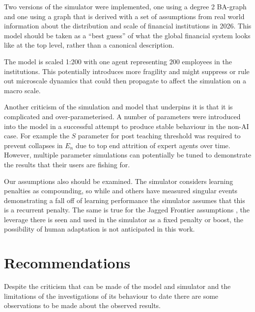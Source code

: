 \documentclass[11pt]{article}
\begin{document}
Two versions of the simulator were implemented, one using a degree 2 BA-graph \cite{albert_statistical_2002} and one using a graph that is derived with a set of assumptions from real world information about the distribution and scale of financial institutions in 2026. This model should be taken as a ``best guess'' of what the global financial system looks like at the top level, rather than a canonical description. 

The model is scaled 1:200 with one agent representing $200$ employees in the institutions. This potentially introduces more fragility and might suppress or rule out microscale dynamics that could then propagate to affect the simulation on a macro scale. 

 Another criticism of the simulation and model that underpins it is that it is complicated and over-parameterised. A number of parameters were introduced into the model in a successful attempt to produce stable behaviour in the non-AI case. For example the $S$ parameter for post teaching threshold was required to prevent collapses in $E_n$ due to top end attrition of expert agents over time. However, multiple parameter simulations can potentially be tuned to demonstrate the results that their users are fishing for.

 Our assumptions also should be examined. The simulator considers learning penalties as compounding, so while \cite{david_stromberg_generative_2026} and others have measured singular events demonstrating a fall off of learning performance the simulator assumes that this is a recurrent penalty. The same is true for the Jagged Frontier assumptions \cite{fabrizio_dellacqua_navigating_nodate}, the leverage there is seen and used in the simulator as a fixed penalty or boost, the possibility of human adaptation is not anticipated in this work. 

\section{Recommendations} \label{sec:recommendations}

Despite the criticism that can be made of the model and simulator and the limitations of the investigations of its behaviour to date there are some observations to be made about the observed results.
\end{document}
